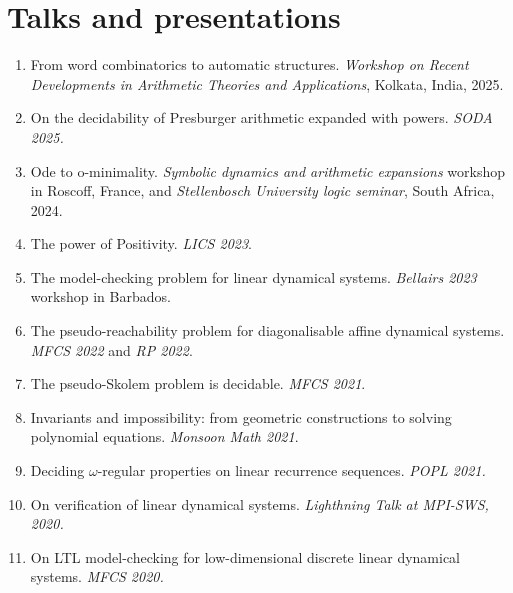 \documentclass{article}
\begin{document}
    
	\section*{Talks and presentations}
	\begin{enumerate}
            \item From word combinatorics to automatic structures. \emph{Workshop on Recent Developments in Arithmetic Theories and Applications}, Kolkata, India, 2025.
            \item On the decidability of Presburger arithmetic expanded with powers. \emph{SODA 2025.}
		\item Ode to o-minimality. \emph{Symbolic dynamics and arithmetic expansions} workshop in Roscoff, France, and \emph{Stellenbosch University logic seminar}, South Africa, 2024.
		\item The power of Positivity. \emph{LICS 2023}.
		\item The model-checking problem for linear dynamical systems. \emph{Bellairs 2023} workshop in Barbados.
		\item The pseudo-reachability problem for diagonalisable affine dynamical systems. \emph{MFCS 2022} and \emph{RP 2022}.
		\item The pseudo-Skolem problem is decidable. \emph{MFCS 2021}.
		\item Invariants and impossibility: from geometric constructions to solving polynomial equations. \emph{Monsoon Math 2021}.
		\item Deciding $\omega$-regular properties on linear recurrence sequences. \emph{POPL 2021.}
		\item On verification of linear dynamical systems. \emph{Lighthning Talk at MPI-SWS, 2020.}
		\item  On LTL model-checking for low-dimensional discrete
		linear dynamical systems. \emph{MFCS 2020.}
	\end{enumerate}
\end{document}
